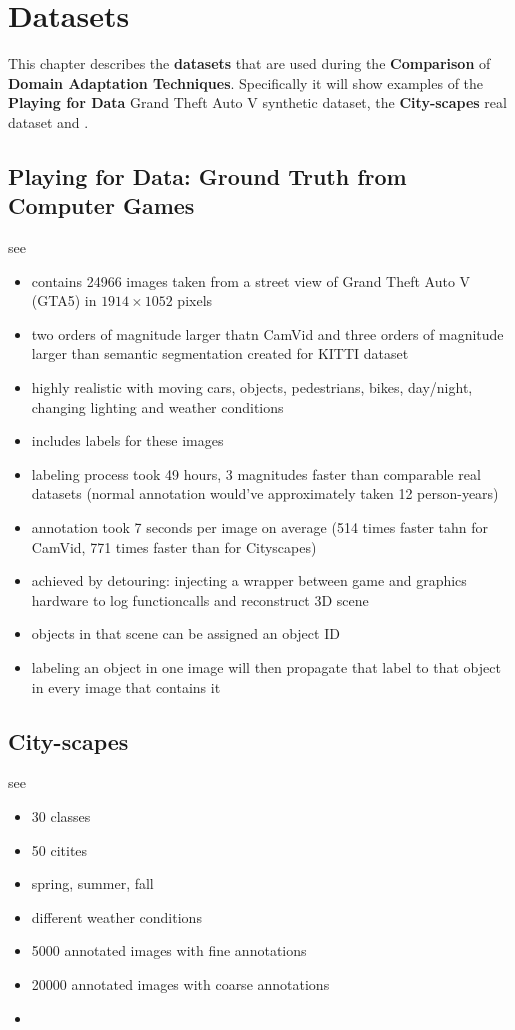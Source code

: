\chapter{Datasets}
\label{sec:datasets}

This chapter describes the \textbf{datasets} that are used during the \textbf{Comparison} of \textbf{Domain Adaptation Techniques}. Specifically it will show examples of the \textbf{Playing for Data} Grand Theft Auto V synthetic dataset, the \textbf{City-scapes} real dataset and .

\section{Playing for Data: Ground Truth from Computer Games}
see \cite{Richter_2016_ECCV}

\begin{itemize}
	\item contains 24966 images taken from a street view of Grand Theft Auto V (GTA5) in $1914 \times 1052$ pixels
	\item two orders of magnitude larger thatn CamVid and three orders of magnitude larger than semantic segmentation created for KITTI dataset
	\item highly realistic with moving cars, objects, pedestrians, bikes, day/night, changing lighting and weather conditions
	\item includes labels for these images
	\item labeling process took 49 hours, 3 magnitudes faster than comparable real datasets (normal annotation would've approximately taken 12 person-years)
	\item annotation took 7 seconds per image on average (514 times faster tahn for CamVid, 771 times faster than for Cityscapes)
	\item achieved by detouring: injecting a wrapper between game and graphics hardware to log functioncalls and reconstruct 3D scene
	\item objects in that scene can be assigned an object ID
	\item labeling an object in one image will then propagate that label to that object in every image that contains it
\end{itemize}

\section{City-scapes}
see \cite{Cordts_2016_CVPR}

\begin{itemize}
	\item 30 classes
	\item 50 citites
	\item spring, summer, fall
	\item different weather conditions
	\item 5000 annotated images with fine annotations
	\item 20000 annotated images with coarse annotations
	\item 
\end{itemize}
